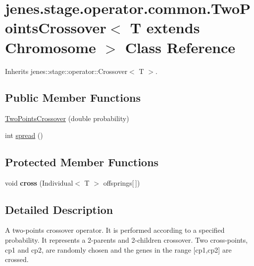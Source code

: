 \hypertarget{classjenes_1_1stage_1_1operator_1_1common_1_1_two_points_crossover_3_01_t_01extends_01_chromosome_01_4}{
\section{jenes.stage.operator.common.TwoPointsCrossover$<$ T extends Chromosome $>$ Class Reference}
\label{classjenes_1_1stage_1_1operator_1_1common_1_1_two_points_crossover_3_01_t_01extends_01_chromosome_01_4}
}
Inherits jenes::stage::operator::Crossover$<$ T $>$.

\subsection*{Public Member Functions}
\begin{CompactItemize}
\item 
\hyperlink{classjenes_1_1stage_1_1operator_1_1common_1_1_two_points_crossover_3_01_t_01extends_01_chromosome_01_4_b7fe58d08e9e9b89881661c16e80f19e}{TwoPointsCrossover} (double probability)
\item 
int \hyperlink{classjenes_1_1stage_1_1operator_1_1common_1_1_two_points_crossover_3_01_t_01extends_01_chromosome_01_4_30115e5f2250765209bed48bda1e5155}{spread} ()
\end{CompactItemize}
\subsection*{Protected Member Functions}
\begin{CompactItemize}
\item 
\hypertarget{classjenes_1_1stage_1_1operator_1_1common_1_1_two_points_crossover_3_01_t_01extends_01_chromosome_01_4_5cf79fb6f728917f5ba48960ff6814ed}{
void \textbf{cross} (Individual$<$ T $>$ offsprings\mbox{[}$\,$\mbox{]})}
\label{classjenes_1_1stage_1_1operator_1_1common_1_1_two_points_crossover_3_01_t_01extends_01_chromosome_01_4_5cf79fb6f728917f5ba48960ff6814ed}

\end{CompactItemize}


\subsection{Detailed Description}
A two-points crossover operator. It is performed according to a specified probability. It represents a 2-parents and 2-children crossover. Two cross-points, cp1 and cp2, are randomly chosen and the genes in the range \mbox{[}cp1,cp2\mbox{]} are crossed. 

